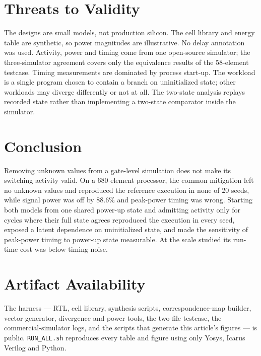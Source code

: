 \documentclass[journal]{IEEEtran}
\begin{document}
\section{Threats to Validity}
The designs are small models, not production silicon. The cell library and energy
table are synthetic, so power magnitudes are illustrative. No delay annotation was
used. Activity, power and timing come from one open-source simulator; the
three-simulator agreement covers only the equivalence results of the 58-element
testcase. Timing measurements are dominated by process start-up. The workload is a
single program chosen to contain a branch on uninitialized state; other workloads
may diverge differently or not at all. The two-state analysis replays recorded
state rather than implementing a two-state comparator inside the simulator.

\section{Conclusion}
Removing unknown values from a gate-level simulation does not make its switching
activity valid. On a 680-element processor, the common mitigation left no unknown
values and reproduced the reference execution in none of 20 seeds, while signal power
was off by 88.6\% and peak-power timing was wrong. Starting both models from one
shared power-up state and admitting activity only for cycles where their full state
agrees reproduced the execution in every seed, exposed a latent dependence on
uninitialized state, and made the sensitivity of peak-power timing to power-up
state measurable. At the scale studied its run-time cost was below timing noise.

\section*{Artifact Availability}
The harness --- RTL, cell library, synthesis scripts, correspondence-map builder,
vector generator, divergence and power tools, the two-file testcase, the
commercial-simulator logs, and the scripts that generate this article's figures ---
is public. \texttt{RUN\_ALL.sh} reproduces every table and figure using only Yosys,
Icarus Verilog and Python.
\end{document}
